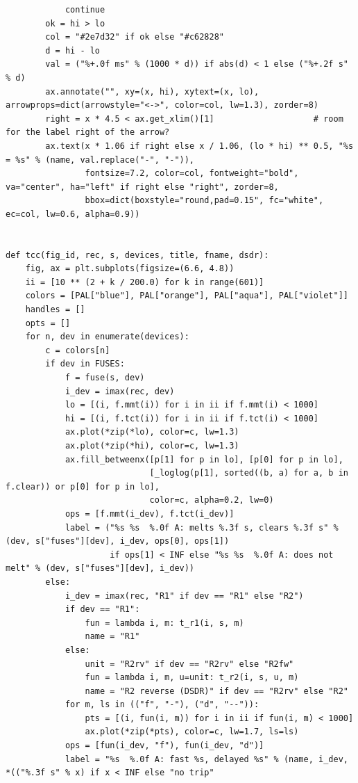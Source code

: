 \documentclass[12pt,a4paper]{article}
\begin{document}
\begin{lstlisting}
            continue
        ok = hi > lo
        col = "#2e7d32" if ok else "#c62828"
        d = hi - lo
        val = ("%+.0f ms" % (1000 * d)) if abs(d) < 1 else ("%+.2f s" % d)
        ax.annotate("", xy=(x, hi), xytext=(x, lo), arrowprops=dict(arrowstyle="<->", color=col, lw=1.3), zorder=8)
        right = x * 4.5 < ax.get_xlim()[1]                    # room for the label right of the arrow?
        ax.text(x * 1.06 if right else x / 1.06, (lo * hi) ** 0.5, "%s = %s" % (name, val.replace("-", "-")),
                fontsize=7.2, color=col, fontweight="bold", va="center", ha="left" if right else "right", zorder=8,
                bbox=dict(boxstyle="round,pad=0.15", fc="white", ec=col, lw=0.6, alpha=0.9))


def tcc(fig_id, rec, s, devices, title, fname, dsdr):
    fig, ax = plt.subplots(figsize=(6.6, 4.8))
    ii = [10 ** (2 + k / 200.0) for k in range(601)]
    colors = [PAL["blue"], PAL["orange"], PAL["aqua"], PAL["violet"]]
    handles = []
    opts = []
    for n, dev in enumerate(devices):
        c = colors[n]
        if dev in FUSES:
            f = fuse(s, dev)
            i_dev = imax(rec, dev)
            lo = [(i, f.mmt(i)) for i in ii if f.mmt(i) < 1000]
            hi = [(i, f.tct(i)) for i in ii if f.tct(i) < 1000]
            ax.plot(*zip(*lo), color=c, lw=1.3)
            ax.plot(*zip(*hi), color=c, lw=1.3)
            ax.fill_betweenx([p[1] for p in lo], [p[0] for p in lo],
                             [_loglog(p[1], sorted((b, a) for a, b in f.clear)) or p[0] for p in lo],
                             color=c, alpha=0.2, lw=0)
            ops = [f.mmt(i_dev), f.tct(i_dev)]
            label = ("%s %s  %.0f A: melts %.3f s, clears %.3f s" % (dev, s["fuses"][dev], i_dev, ops[0], ops[1])
                     if ops[1] < INF else "%s %s  %.0f A: does not melt" % (dev, s["fuses"][dev], i_dev))
        else:
            i_dev = imax(rec, "R1" if dev == "R1" else "R2")
            if dev == "R1":
                fun = lambda i, m: t_r1(i, s, m)
                name = "R1"
            else:
                unit = "R2rv" if dev == "R2rv" else "R2fw"
                fun = lambda i, m, u=unit: t_r2(i, s, u, m)
                name = "R2 reverse (DSDR)" if dev == "R2rv" else "R2"
            for m, ls in (("f", "-"), ("d", "--")):
                pts = [(i, fun(i, m)) for i in ii if fun(i, m) < 1000]
                ax.plot(*zip(*pts), color=c, lw=1.7, ls=ls)
            ops = [fun(i_dev, "f"), fun(i_dev, "d")]
            label = "%s  %.0f A: fast %s, delayed %s" % (name, i_dev, *(("%.3f s" % x) if x < INF else "no trip"

\end{lstlisting}
\end{document}
